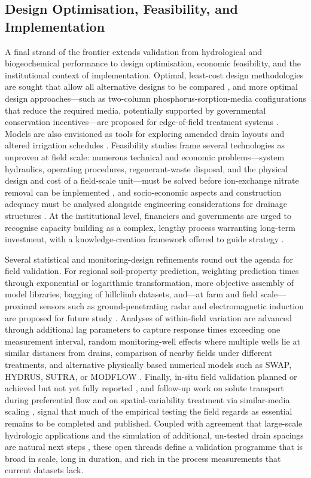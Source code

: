 \documentclass[11pt]{article}
\begin{document}
\subsection{Design Optimisation, Feasibility, and Implementation}

A final strand of the frontier extends validation from hydrological and biogeochemical performance to design optimisation, economic feasibility, and the institutional context of implementation. Optimal, least-cost design methodologies are sought that allow all alternative designs to be compared \parencite{Bakour2021}, and more optimal design approaches---such as two-column phosphorus-sorption-media configurations that reduce the required media, potentially supported by governmental conservation incentives---are proposed for edge-of-field treatment systems \parencite{Hauda2020}. Models are also envisioned as tools for exploring amended drain layouts and altered irrigation schedules \parencite{Alzraiee2013b}. Feasibility studies frame several technologies as unproven at field scale: numerous technical and economic problems---system hydraulics, operating procedures, regenerant-waste disposal, and the physical design and cost of a field-scale unit---must be solved before ion-exchange nitrate removal can be implemented \parencite{MAGETTE1990}, and socio-economic aspects and construction adequacy must be analysed alongside engineering considerations for drainage structures \parencite{Bozic2014}. At the institutional level, financiers and governments are urged to recognise capacity building as a complex, lengthy process warranting long-term investment, with a knowledge-creation framework offered to guide strategy \parencite{Ritzema2008}.

Several statistical and monitoring-design refinements round out the agenda for field validation. For regional soil-property prediction, weighting prediction times through exponential or logarithmic transformation, more objective assembly of model libraries, bagging of hillclimb datasets, and---at farm and field scale---proximal sensors such as ground-penetrating radar and electromagnetic induction are proposed for future study \parencite{Moller2018}. Analyses of within-field variation are advanced through additional lag parameters to capture response times exceeding one measurement interval, random monitoring-well effects where multiple wells lie at similar distances from drains, comparison of nearby fields under different treatments, and alternative physically based numerical models such as SWAP, HYDRUS, SUTRA, or MODFLOW \parencite{vandeCraats2025}. Finally, in-situ field validation planned or achieved but not yet fully reported \parencite{Hartani2001}, and follow-up work on solute transport during preferential flow and on spatial-variability treatment via similar-media scaling \parencite{Mohanty1997}, signal that much of the empirical testing the field regards as essential remains to be completed and published. Coupled with agreement that large-scale hydrologic applications and the simulation of additional, un-tested drain spacings are natural next steps \parencite{Talukolaee2022}, these open threads define a validation programme that is broad in scale, long in duration, and rich in the process measurements that current datasets lack.

\printbibliography
\end{document}
